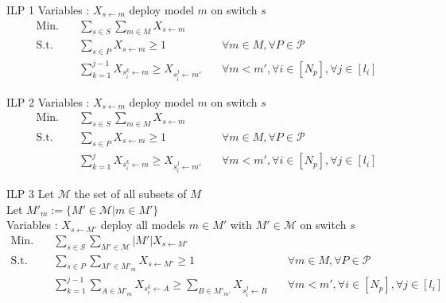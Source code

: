 \documentclass[8pt]{beamer}
\begin{document}
\begin{frame}{ILP 1}
    Variables : $X_{s \gets m}$ deploy model $m$ on switch $s$
    \begin{equation*}
        \begin{aligned}
            \mathrm{Min.} \quad & \sum_{s \in S} \sum_{m \in M} X_{s \gets m} \\[1em]
            \mathrm{S.t.}
            \quad & \sum_{s \in P} X_{s \gets m} \geq 1
            \quad & \forall m \in M, \forall P \in \mathcal{P} \\
            \quad & \sum_{k=1}^{j-1} X_{s_i^k \gets m} \geq X_{s_i^j\gets m'}
            \quad & \forall m < m',\forall i \in [N_p], \forall j \in [l_i]
        \end{aligned}
    \end{equation*}
\end{frame}

\begin{frame}{ILP 2}
    Variables : $X_{s \gets m}$ deploy model $m$ on switch $s$
    \begin{equation*}
        \begin{aligned}
            \mathrm{Min.} \quad & \sum_{s \in S} \sum_{m \in M} X_{s \gets m} \\[1em]
            \mathrm{S.t.}
            \quad & \sum_{s \in P} X_{s \gets m} \geq 1
            \quad & \forall m \in M, \forall P \in \mathcal{P} \\
            \quad & \sum_{k=1}^{j} X_{s_i^k \gets m} \geq X_{s_i^j \gets m'}
            \quad & \forall m < m',\forall i \in [N_p], \forall j \in [l_i]
        \end{aligned}
    \end{equation*}
\end{frame}

\begin{frame}{ILP 3}
    Let $\mathcal{M}$ the set of all subsets of $M$\\
    Let $M'_m := \{M' \in \mathcal{M} | m \in M'\}$\\
    Variables : $X_{s \gets M'}$ deploy all models $m \in M'$ with $M' \in \mathcal{M}$ on switch $s$
    \begin{equation*}
        \begin{aligned}
            \mathrm{Min.} \quad & \sum_{s \in S} \sum_{M' \in \mathcal{M}} |M'|X_{s \gets M'} \\[1em]
            \mathrm{S.t.}
            \quad & \sum_{s \in P} \sum_{M' \in M'_m} X_{s \gets M'} \geq 1
            \quad & \forall m \in M, \forall P \in \mathcal{P} \\
            \quad & \sum_{k=1}^{j-1} \sum_{A \in M'_m} X_{s_i^k \gets A} \geq \sum_{B \in M'_{m'}} X_{s_i^j\gets B}
            \quad & \forall m < m',\forall i \in [N_p], \forall j \in [l_i]
        \end{aligned}
    \end{equation*}
\end{frame}
\end{document}
